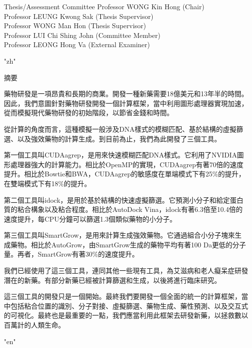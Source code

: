 \documentclass[12pt]{report}
\begin{document}
\coverpage

\thispagestyle{empty}
\vspace*{2cm}
\begin{center}
\vskip 4cm
\Large
Thesis/Assessment Committee
\vskip 2cm
\large
Professor WONG Kin Hong (Chair)\\
\vskip 0.2cm
Professor LEUNG Kwong Sak (Thesis Supervisor)\\
\vskip 0.2cm
Professor WONG Man Hon (Thesis Supervisor)\\
\vskip 0.2cm
Professor LUI Chi Shing John (Committee Member)\\
\vskip 0.2cm
Professor LEONG Hong Va (External Examiner)\\
\end{center}
\newpage


\abstractpage

\XeTeXlinebreaklocale "zh"
\newfontfamily{}
\vspace*{1cm}
\large \noindent
\begin{center}
{\chinesefont 摘要}\\
\end{center}
\vskip 1cm \noindent
{\chinesefont 藥物研發是一項昂貴和長期的商業。開發一種新藥需要18億美元和13年半的時間。因此，我們意圖針對藥物研發開發一個計算框架，當中利用圖形處理器實現加速，從而模擬現代藥物研發的初始階段，以節省金錢和時間。

從計算的角度而言，這種模擬一般涉及DNA樣式的模糊匹配、基於結構的虛擬篩選、以及強效藥物的計算生成。到目前為止，我們為此開發了三個工具。

第一個工具叫CUDAagrep，是用來快速模糊匹配DNA樣式。它利用了NVIDIA圖形處理器強大的計算能力。相比於OpenMP的實現，CUDAagrep有著70倍的速度提升。相比於Bowtie和BWA，CUDAagrep的敏感度在單端模式下有25\%的提升，在雙端模式下有18\%的提升。

第二個工具叫idock，是用於基於結構的快速虛擬篩選。它預測小分子和給定蛋白質的粘合構象以及粘合程度。相比於AutoDock Vina，idock有著6.3倍至10.4倍的速度提升，每CPU分鐘可以篩選1.3個類似藥物的小分子。

第三個工具叫SmartGrow，是用來計算生成強效藥物。它通過組合小分子塊來生成藥物。相比於AutoGrow，由SmartGrow生成的藥物平均有著100 Da更低的分子量。再者，SmartGrow有著30\%的速度提升。

我們已經使用了這三個工具，連同其他一些現有工具，為艾滋病和老人癡呆症研發潛在的新藥。有部分新藥已經被計算篩選和生成，以後將進行臨床研究。

這三個工具的開發只是一個開始。最終我們要開發一個全面的統一的計算框架，當中包括粘合位置的識別、分子對接、虛擬篩選、藥物生成、藥性預測、以及交互式的可視化。最終也是最重要的一點，我們應當利用此框架去研發新藥，以拯救數以百萬計的人類生命。}
\newpage
\XeTeXlinebreaklocale "en"
\end{document}
